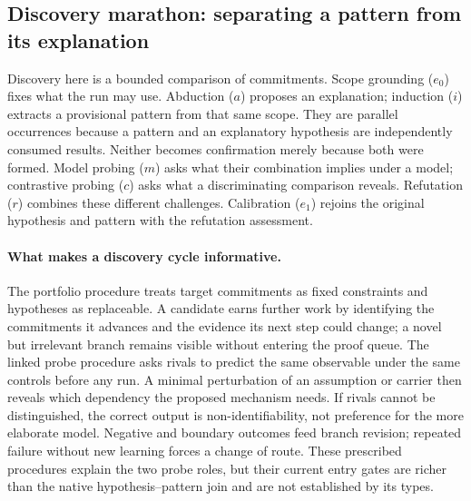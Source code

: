 \subsection{Discovery marathon: separating a pattern from its explanation}
\label{app:granular-discovery-marathon-loop}
Discovery here is a bounded comparison of commitments. Scope grounding ($e_0$)
fixes what the run may use. Abduction ($a$) proposes an explanation; induction
($i$) extracts a provisional pattern from that same scope. They are parallel
occurrences because a pattern and an explanatory hypothesis are independently
consumed results. Neither becomes confirmation merely because both were formed.
Model probing ($m$) asks what their combination implies under a model;
contrastive probing ($c$) asks what a discriminating comparison reveals.
Refutation ($r$) combines these different challenges. Calibration ($e_1$)
rejoins the original hypothesis and pattern with the refutation assessment.

\paragraph{What makes a discovery cycle informative.}
The portfolio procedure treats target commitments as fixed constraints and
hypotheses as replaceable. A candidate earns further work by identifying the
commitments it advances and the evidence its next step could change; a novel but
irrelevant branch remains visible without entering the proof queue. The linked
probe procedure asks rivals to predict the same observable under the same
controls before any run. A minimal perturbation of an assumption or carrier then
reveals which dependency the proposed mechanism needs. If rivals cannot be
distinguished, the correct output is non-identifiability, not preference for the
more elaborate model. Negative and boundary outcomes feed branch revision;
repeated failure without new learning forces a change of route. These prescribed
procedures explain the two probe roles, but their current entry gates are richer
than the native hypothesis--pattern join and are not established by its types.


